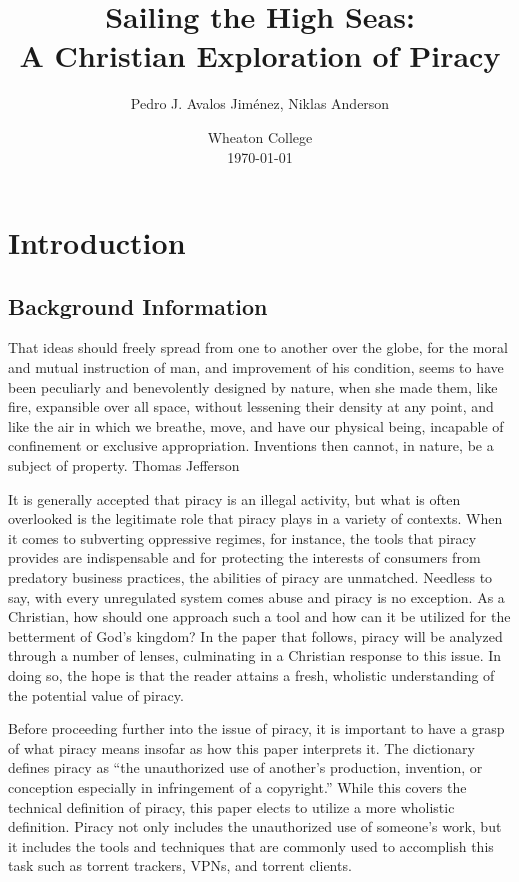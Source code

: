 \documentclass[onecolumn, 12pt]{article}
\title{Sailing the High Seas:\\ A Christian Exploration of Piracy}
\author{Pedro J. Avalos Jim\'enez, Niklas Anderson}
\date{Wheaton College\\\today}
\begin{document}
\maketitle

\section{Introduction}

\subsection{Background Information}

\begin{displayquote}
  \textins That ideas should freely spread from one to another over the globe, for the
    moral and mutual instruction of man, and improvement of his condition, seems to have been
    peculiarly and benevolently designed by nature, when she made them, like fire, expansible
    over all space, without lessening their density at any point, and like the air in which we
    breathe, move, and have our physical being, incapable of confinement or exclusive
    appropriation. Inventions then cannot, in nature, be a subject of property.  Thomas
    Jefferson ~\cite{barlow:wine}
\end{displayquote}
It is generally accepted that piracy is an illegal activity, but what is often overlooked
is the legitimate role that piracy plays in a variety of contexts. When it comes to
subverting oppressive regimes, for instance, the tools that piracy provides are
indispensable and for protecting the interests of consumers from predatory business
practices, the abilities of piracy are unmatched. Needless to say, with every unregulated
system comes abuse and piracy is no exception. As a Christian, how should one approach
such a tool and how can it be utilized for the betterment of God's kingdom? In the paper
that follows, piracy will be analyzed through a number of lenses, culminating in a
Christian response to this issue. In doing so, the hope is that the reader attains a
fresh, wholistic understanding of the potential value of piracy.

Before proceeding further into the issue of piracy, it is important to have a grasp of
what piracy means insofar as how this paper interprets it. The dictionary defines piracy
as ``the unauthorized use of another's production, invention, or conception especially in
infringement of a copyright.'' While this covers the technical definition of piracy, this
paper elects to utilize a more wholistic definition. Piracy not only includes the
unauthorized use of someone's work, but it includes the tools and techniques that are
commonly used to accomplish this task such as torrent trackers, VPNs, and torrent clients.
\end{document}
